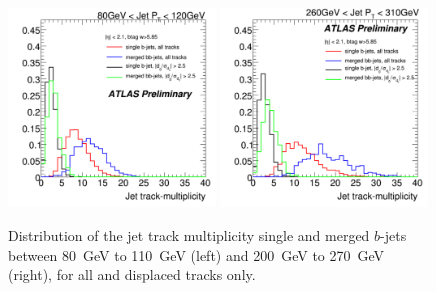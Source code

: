 \begin{figure}[tp]
\centering
\includegraphics[width=0.49\textwidth]{FIGS/TEMPFigs/DisplacedTracks/ntrk_singlemerged_AllandDisplaced_80-120.pdf}
\includegraphics[width=0.49\textwidth]{FIGS/TEMPFigs/DisplacedTracks/ntrk_singlemerged_AllandDisplaced_260-310.pdf}
\caption{Distribution of the jet track multiplicity single and merged $b$-jets between 80~GeV to 110~GeV (left) and 200~GeV to 270~GeV (right), for all and displaced tracks only.}
\label{fig:displacedntrk}
\end{figure}


